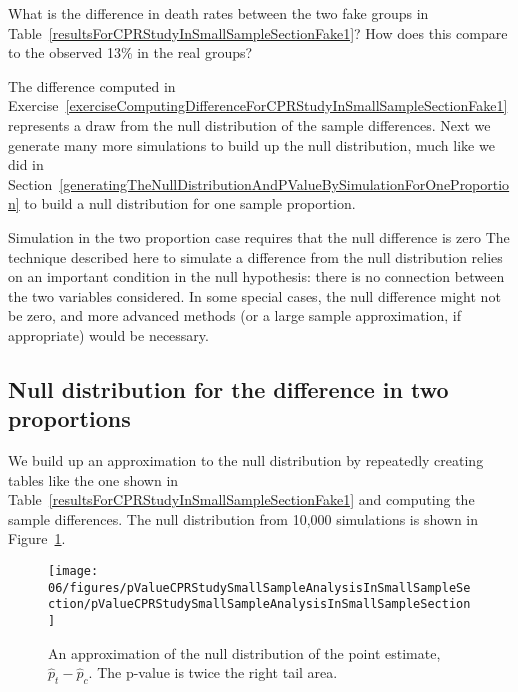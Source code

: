 \begin{exercise} \label{exerciseComputingDifferenceForCPRStudyInSmallSampleSectionFake1}
What is the difference in death rates between the two fake groups in Table~\ref{resultsForCPRStudyInSmallSampleSectionFake1}? How does this compare to the observed 13\% in the real groups?
\end{exercise}

The difference computed in Exercise~\ref{exerciseComputingDifferenceForCPRStudyInSmallSampleSectionFake1} represents a draw from the null distribution of the sample differences. Next we generate many more simulations to build up the null distribution, much like we did in Section~\ref{generatingTheNullDistributionAndPValueBySimulationForOneProportion} to build a null distribution for one sample proportion.

\begin{caution}{Simulation in the two proportion case requires that the null difference is zero}
{The technique described here to simulate a difference from the null distribution relies on an important condition in the null hypothesis: there is no connection between the two variables considered. In some special cases, the null difference might not be zero, and more advanced methods (or a large sample approximation, if appropriate) would be necessary.}
\end{caution}

\subsection{Null distribution for the difference in two proportions}

We build up an approximation to the null distribution by repeatedly creating tables like the one shown in Table~\ref{resultsForCPRStudyInSmallSampleSectionFake1} and computing the sample differences. The null distribution from 10,000 simulations is shown in Figure~\ref{pValueCPRStudySmallSampleAnalysisInSmallSampleSection}.
\begin{figure}
\centering
\texttt{[image: 06/figures/pValueCPRStudySmallSampleAnalysisInSmallSampleSection/pValueCPRStudySmallSampleAnalysisInSmallSampleSection]}
\caption{An approximation of the null distribution of the point estimate, $\hat{p}_t - \hat{p}_c$. The p-value is twice the right tail area.} %
\label{pValueCPRStudySmallSampleAnalysisInSmallSampleSection}
\end{figure}

